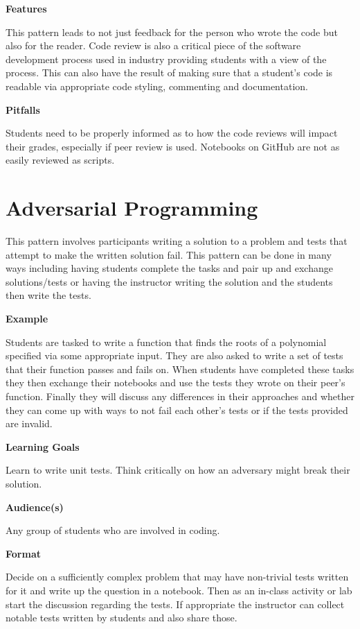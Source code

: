 \documentclass[]{book}
\begin{document}
\textbf{Features}

This pattern leads to not just feedback for the person who wrote the
code but also for the reader. Code review is also a critical piece of
the software development process used in industry providing students
with a view of the process. This can also have the result of making sure
that a student's code is readable via appropriate code styling,
commenting and documentation.

\textbf{Pitfalls}

Students need to be properly informed as to how the code reviews will
impact their grades, especially if peer review is used. Notebooks on
GitHub are not as easily reviewed as scripts.

\section{Adversarial Programming}\label{adversarial-programming}

This pattern involves participants writing a solution to a problem and
tests that attempt to make the written solution fail. This pattern can
be done in many ways including having students complete the tasks and
pair up and exchange solutions/tests or having the instructor writing
the solution and the students then write the tests.

\textbf{Example}

Students are tasked to write a function that finds the roots of a
polynomial specified via some appropriate input. They are also asked to
write a set of tests that their function passes and fails on. When
students have completed these tasks they then exchange their notebooks
and use the tests they wrote on their peer's function. Finally they will
discuss any differences in their approaches and whether they can come up
with ways to not fail each other's tests or if the tests provided are
invalid.

\textbf{Learning Goals}

Learn to write unit tests. Think critically on how an adversary might
break their solution.

\textbf{Audience(s)}

Any group of students who are involved in coding.

\textbf{Format}

Decide on a sufficiently complex problem that may have non-trivial tests
written for it and write up the question in a notebook. Then as an
in-class activity or lab start the discussion regarding the tests. If
appropriate the instructor can collect notable tests written by students
and also share those.
\end{document}
